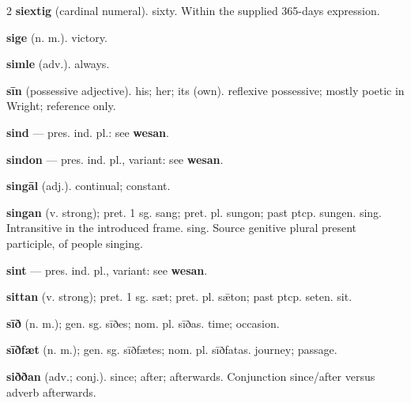 \begin{multicols*}{2}
\textbf{siextig} (cardinal numeral). sixty. Within the supplied 365-days expression.\par
\textbf{sige} (n. m.). victory.\par
\textbf{simle} (adv.). always.\par
\textbf{sīn} (possessive adjective). his; her; its (own). reflexive possessive; mostly poetic in Wright; reference only.\par
\textbf{sind} — pres. ind. pl.: see \textbf{wesan}.\par
\textbf{sindon} — pres. ind. pl., variant: see \textbf{wesan}.\par
\textbf{singāl} (adj.). continual; constant.\par
\textbf{singan} (v. strong); pret. 1 sg. sang; pret. pl. sungon; past ptcp. sungen. sing. Intransitive in the introduced frame. sing. Source genitive plural present participle, of people singing.\par
\textbf{sint} — pres. ind. pl., variant: see \textbf{wesan}.\par
\textbf{sittan} (v. strong); pret. 1 sg. sæt; pret. pl. sǣton; past ptcp. seten. sit.\par
\textbf{sīð} (n. m.); gen. sg. sīðes; nom. pl. sīðas. time; occasion.\par
\textbf{sīðfæt} (n. m.); gen. sg. sīðfætes; nom. pl. sīðfatas. journey; passage.\par
\textbf{siððan} (adv.; conj.). since; after; afterwards. Conjunction since/after versus adverb afterwards.\par

\end{multicols*}
